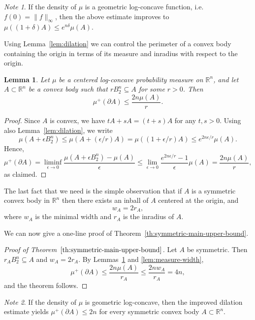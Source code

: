 \documentclass[11pt,leqno]{article}
\newtheorem{lemma}[theorem]{Lemma}
\theoremstyle{remark}
\newtheorem*{note*}{Note}
\numberwithin{equation}{section}
\newcommand{\ls}{\leqslant}
\begin{document}
\begin{note*}\rm If the density of $\mu$ is a geometric log-concave function, i.e. $f(0)=\|f\|_{\infty}$, 
then the above estimate improves to $\mu((1+\delta)A)\ls e^{n\delta }\mu(A).$
\end{note*}

Using Lemma~\ref{lem:dilation} we can control the perimeter of a convex body containing the origin in terms of its measure
and inradius with respect to the origin.

\begin{lemma}\label{lem:center-origin}
Let $\mu$ be a centered log-concave probability measure on $\mathbb{R}^n$, and let $A\subset\mathbb{R}^n$ be a convex body 
such that $rB_2^n\subseteq A$ for some $r>0$. Then
$$\mu^+(\partial A)\ls \frac{2n\mu(A)}{r}.$$
\end{lemma}

\begin{proof}
Since $A$ is convex, we have $tA+sA=(t+s)A$ for any $t,s>0$. Using also Lemma~\ref{lem:dilation}, we write
$$\mu(A+\epsilon B_2^n)\ls \mu(A+(\epsilon /r)A)= \mu((1+\epsilon /r)A)\ls e^{2n\epsilon /r}\mu(A).$$
Hence,
$$\mu^+(\partial A) =\liminf_{\epsilon\to 0}\frac{\mu(A+\epsilon B_2^n)-\mu(A)}{\epsilon}\ls
\lim_{\epsilon\to 0}\frac{e^{2n\epsilon /r}-1}{\epsilon }\mu(A)=\frac{2n \mu(A)}{r},$$
as claimed.
\end{proof} 

The last fact that we need is the simple observation that if $A$ is a symmetric convex body in $\mathbb{R}^n$ then there exists an inball of $A$ centered  
at the origin, and 
\begin{equation}\label{eq:symmetric-w-r}
w_A=2r_A,
\end{equation} 
where $w_A$ is the minimal width and $r_A$ is the inradius of $A$.

We can now give a one-line proof of Theorem~\ref{th:symmetric-main-upper-bound}.

\begin{proof}[Proof of Theorem~$\ref{th:symmetric-main-upper-bound}$]
Let $A$ be symmetric. Then $r_AB_2^n\subseteq A$ and $w_A=2r_A$. By Lemmas~\ref{lem:center-origin} and \ref{lem:measure-width},
$$\mu^+(\partial A)\ls \frac{2n\mu(A)}{r_A}\ls \frac{2n w_A}{r_A}=4n,$$
and the theorem follows.
\end{proof}

\begin{note*}\rm If the density of $\mu$ is geometric log-concave, then the improved dilation estimate yields 
$\mu^+(\partial A)\ls 2n$ for every symmetric convex body $A\subset\mathbb{R}^n$.
\end{note*}
\end{document}
